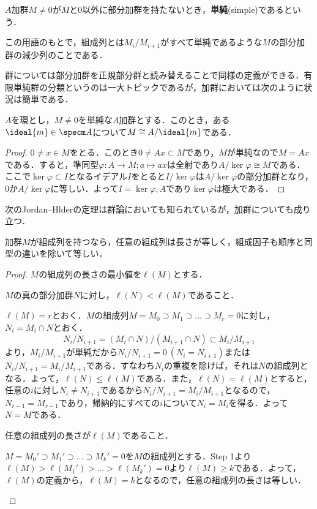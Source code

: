 \begin{defi}[単純加群]
	$A$加群$M\neq0$が$M$と0以外に部分加群を持たないとき，\textbf{単純}(simple)であるという．
\end{defi}

この用語のもとで，組成列とは$M_i/M_{i+1}$がすべて単純であるような$M$の部分加群の減少列のことである．

群については部分加群を正規部分群と読み替えることで同様の定義ができる．有限単純群の分類というのは一大トピックであるが，加群においては次のように状況は簡単である．

\begin{prop}\label{prop:単純加群の構造}
	$A$を環とし，$M\neq 0$を単純な$A$加群とする．このとき，ある$\ideal{m}\in\specm A$について$M\cong A/\ideal{m}$である．
\end{prop}

\begin{proof}
	$0\neq x\in M$をとる．このとき$0\neq Ax\subset M$であり，$M$が単純なので$M=Ax$である．すると，準同型$\varphi:A\to M;a\mapsto ax$は全射であり$A/\ker\varphi\cong M$である．ここで$\ker\varphi\subset I$となるイデアル$I$をとると$I/\ker\varphi$は$A/\ker\varphi$の部分加群となり，$0$か$A/\ker\varphi$に等しい．よって$I=\ker\varphi,A$であり$\ker\varphi$は極大である．
\end{proof}

次のJordan--Hlderの定理は群論においても知られているが，加群についても成り立つ．
\begin{thm}
	加群$M$が組成列を持つなら，任意の組成列は長さが等しく，組成因子も順序と同型の違いを除いて等しい．
\end{thm}

\begin{proof}
	$M$の組成列の長さの最小値を$\ell(M)$とする．
	\begin{step}
		\item $M$の真の部分加群$N$に対し，$\ell(N)<\ell(M)$であること．
		
		$\ell(M)=r$とおく．$M$の組成列$M=M_0\supset M_1\supset\dots\supset M_r=0$に対し，$N_i=M_i\cap N$とおく．
		\[N_i/N_{i+1}=(M_i\cap N)/(M_{i+1}\cap N)\subset M_i/M_{i+1}\]
		より，$M_i/M_{i+1}$が単純だから$N_i/N_{i+1}=0~(N_i=N_{i+1})$または$N_i/N_{i+1}=M_i/M_{i+1}$である．すなわち$N_i$の重複を除けば，それは$N$の組成列となる．よって，$\ell(N)\leq\ell(M)$である．また，$\ell(N)=\ell(M)$とすると，任意の$i$に対し$N_i\neq N_{i+1}$であるから$N_i/N_{i+1}=M_i/M_{i+1}$となるので，$N_{r-1}=M_{r-1}$であり，帰納的にすべての$i$について$N_i=M_i$を得る．よって$N=M$である．
		
		\item 任意の組成列の長さが$\ell(M)$であること．
		
		$M={M_0}'\supset{M_1}'\supset\dots\supset{M_k}'=0$を$M$の組成列とする．Step 1より$\ell(M)>\ell({M_1}')>\dots>\ell({M_k}')=0$より$\ell(M)\geq k$である．よって，$\ell(M)$の定義から，$\ell(M)=k$となるので，任意の組成列の長さは等しい．
	\end{step}
\end{proof}

